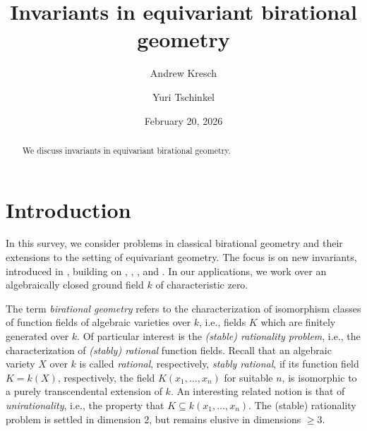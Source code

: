 \documentclass[12pt,reqno]{amsart}
\theoremstyle{plain}
\theoremstyle{remark}
\theoremstyle{definition}
\numberwithin{equation}{section}
\begin{document}
\title[Equivariant birational geometry]{Invariants in equivariant birational geometry}



\author[Andrew Kresch]{Andrew Kresch}
\address{
  Institut f\"ur Mathematik,
  Universit\"at Z\"urich,
  Winterthurerstrasse 190,
  CH-8057 Z\"urich, Switzerland
}


\author[Yuri Tschinkel]{Yuri Tschinkel}
\address{
  Courant Institute,
  251 Mercer Street,
  New York, NY 10012, USA
}

\address{Simons Foundation\\
160 Fifth Avenue\\
New York, NY 10010\\
USA}


\date{February 20, 2026}

\begin{abstract}
We discuss invariants in equivariant birational geometry.
\end{abstract}

\maketitle

\section{Introduction}
\label{sec.intro}
In this survey, we consider problems in classical birational geometry and their extensions to the setting of equivariant geometry. The focus is on new invariants, introduced in \cite{BnG}, building on \cite{KT}, \cite{KPT}, \cite{Bbar}, and 
\cite{HKTsmall}. 
In our applications, we work over an algebraically closed ground field $k$ of characteristic zero. 

The term {\em birational geometry} refers to the characterization of isomorphism classes of function fields of algebraic varieties over $k$, i.e., fields $K$ which are finitely generated over $k$. 
Of particular interest is the {\em  (stable) rationality problem}, i.e., 
the characterization of {\em (stably) rational} function fields. 
Recall that an algebraic variety $X$ over $k$ is called {\em rational}, respectively, {\em stably rational}, if its function field $K=k(X)$, respectively, the field $K(x_1,\ldots, x_n)$ for suitable $n$, 
is isomorphic to a purely transcendental extension of $k$. 
An interesting related notion is that of {\em unirationality}, 
i.e., the property that $K\subseteq k(x_1,\ldots, x_n)$.
The (stable) rationality problem is settled in dimension 2, but remains elusive in dimensions $\ge 3$. 
\end{document}
